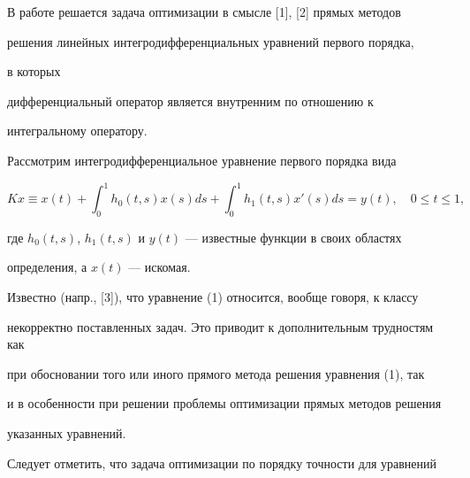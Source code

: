 

\maketitle 


\label{begin} 


 


 


 


В работе решается задача оптимизации в смысле [1], [2] прямых методов 


решения линейных интегродифференциальных уравнений первого порядка, 


в которых 


дифференциальный оператор является внутренним по отношению к 


интегральному оператору. 


 


Рассмотрим интегродифференциальное уравнение первого порядка вида 


\begin{equation} 


Kx\equiv x(t)+\int^1_0 h_0(t,s)x(s)ds+\int^1_0 h_1(t,s) 


x'(s)ds=y(t),\quad 0\le t\le1, 


\end{equation} 


где $h_0(t,s)$, $h_1(t,s)$ и $y(t)$ --- известные функции в своих областях 


определения, а $x(t)$ --- искомая. 


 


Известно (напр., [3]), что уравнение (1) относится, вообще говоря, к классу 


некорректно поставленных задач. Это приводит к дополнительным трудностям как 


при обосновании того или иного прямого метода решения уравнения (1), так 


и в особенности при решении проблемы оптимизации прямых методов решения 


указанных уравнений. 


 


Следует отметить, что задача оптимизации по порядку точности для уравнений 


